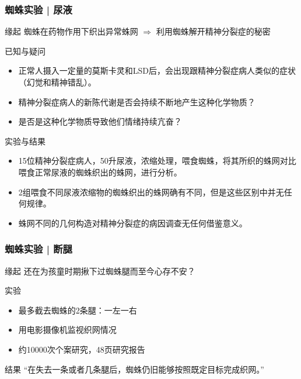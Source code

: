 \begin{frame}
  \frametitle{蜘蛛实验 | 尿液}
  \vspace{-0.5em}
  \begin{block}{缘起}
    蜘蛛在药物作用下织出异常蛛网 $\Rightarrow$ 利用蜘蛛解开精神分裂症的秘密
  \end{block}
  \vspace{-0.5em}
  \pause
  \begin{block}{已知与疑问}
    \begin{itemize}
      \item 正常人摄入一定量的莫斯卡灵和LSD后，会出现跟精神分裂症病人类似的症状（幻觉和精神错乱）。
      \item 精神分裂症病人的新陈代谢是否会持续不断地产生这种化学物质？
      \item 是否是这种化学物质导致他们情绪持续亢奋？
    \end{itemize}
  \end{block}
  \vspace{-0.5em}
  \pause
  \begin{block}{实验与结果}
    \begin{itemize}
      \item 15位精神分裂症病人，50升尿液，浓缩处理，喂食蜘蛛，将其所织的蛛网对比喂食正常尿液的蜘蛛织出的蛛网，进行分析。
      \item 2组喂食不同尿液浓缩物的蜘蛛织出的蛛网确有不同，但是这些区别中并无任何规律。
      \item 蛛网不同的几何构造对精神分裂症的病因调查无任何借鉴意义。
    \end{itemize}
  \end{block}
\end{frame}

\begin{frame}
  \frametitle{蜘蛛实验 | 断腿}
  \begin{block}{缘起}
    还在为孩童时期揪下过蜘蛛腿而至今心存不安？
  \end{block}
  \pause
  \begin{block}{实验}
    \begin{itemize}
      \item 最多截去蜘蛛的2条腿：一左一右
      \item 用电影摄像机监视织网情况
      \item 约10000次个案研究，48页研究报告
    \end{itemize}
  \end{block}
  \pause
  \begin{block}{结果}
    “在失去一条或者几条腿后，蜘蛛仍旧能够按照既定目标完成织网。”
  \end{block}
\end{frame}

